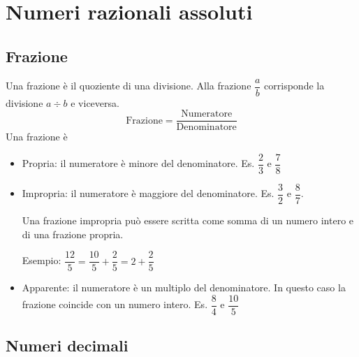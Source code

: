 \chapter{Numeri razionali assoluti}
\label{cha:NumeriRazionaliAssoluti}
\minitoc
\mtcskip                                %
\minilof                                %
\mtcskip                                %
\minilot
\section{Frazione}
\label{sec:fraczioniNumRazASS}
Una frazione è il quoziente di una divisione. Alla frazione $\dfrac{a}{b}$ corrisponde la divisione $a\div b$ e viceversa.
\[
\text{Frazione}=
\dfrac{\text{Numeratore}}{\text{Denominatore}}
\]
Una frazione è\begin{itemize}
	\item Propria: il numeratore è minore del denominatore. Es. $\dfrac{2}{3}$ e $\dfrac{7}{8}$
	\item Impropria: il numeratore è maggiore del denominatore. Es. $\dfrac{3}{2}$ e $\dfrac{8}{7}$.
	
	Una frazione impropria può essere scritta come somma di un numero intero e di una frazione propria. 
	
	Esempio: $\dfrac{12}{5}=\dfrac{10}{5}+\dfrac{2}{5}=2+\dfrac{2}{5}$ 
	\item Apparente: il numeratore è un multiplo del denominatore. In questo caso la frazione coincide con un numero intero. Es. $\dfrac{8}{4}$ e $\dfrac{10}{5}$
\end{itemize}
\section{Numeri decimali}
\label{Numeri decimali}
